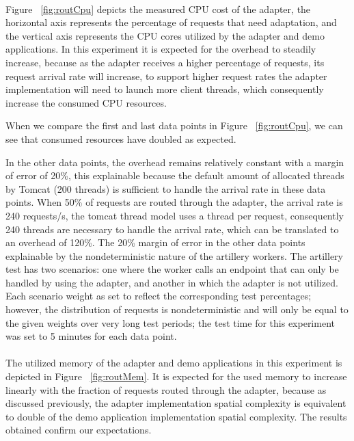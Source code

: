 \paragraph{}

Figure ~\ref{fig:routCpu} depicts the measured CPU cost of the adapter, the horizontal axis represents the percentage of requests that need adaptation, and the vertical axis represents the
CPU cores utilized by the adapter and demo applications.
In this experiment it is expected for the overhead to steadily increase, because as the adapter receives a higher percentage of requests, its request arrival rate will increase, to support higher request rates
the adapter implementation will need to launch more client threads, which consequently increase the consumed CPU resources.

When we compare the first and last data points in Figure ~\ref{fig:routCpu}, we can see that consumed resources have doubled as expected.

In the other data points, the overhead remains relatively constant with a margin of error of 20\%,
this explainable because the default amount of allocated threads by Tomcat (200 threads) is sufficient to handle the arrival rate in these data points.
When 50\% of requests are routed through the adapter, the arrival rate is 240 requests/s, the tomcat thread model uses a thread per request,
consequently 240 threads are necessary to handle the arrival rate, which can be translated to an overhead of 120\%.
The 20\% margin of error in the other data points explainable by the nondeterministic nature of the artillery workers.
The artillery test has two scenarios: one where the worker calls an endpoint that can only be handled by using the adapter, and another in which the adapter is not utilized.
Each scenario weight as set to reflect the corresponding test percentages;
however, the distribution of requests is nondeterministic and will only be equal to the given weights over very long test periods;
the test time for this experiment was set to 5 minutes for each data point.

\paragraph{}

The utilized memory of the adapter and demo applications in this experiment is depicted in Figure ~\ref{fig:routMem}.
It is expected for the used memory to increase linearly with the fraction of requests routed through the adapter, because as discussed previously,
the adapter implementation spatial complexity is equivalent to double of the demo application implementation spatial complexity.
The results obtained confirm our expectations.

